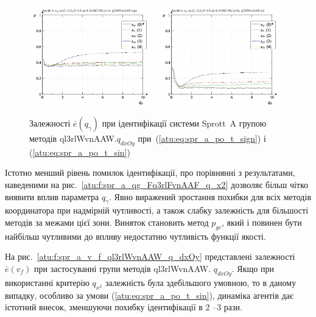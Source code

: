 \begin{figure}[htb!]
  \centerline{
    \includegraphics[width=0.49\textwidth]{p/cha/spr_a/ql3rlWvnAAW_dxOy/sprott_a_id2-p_q_gamma_sign.png}
    \hfill
    \includegraphics[width=0.49\textwidth]{p/cha/spr_a/ql3rlWvnAAW_dxOy/sprott_a_id2-p_q_gamma_sin.png}
  }
\caption{Залежності $ \overline{e} (q_\gamma) $ при ідентифікації системи Sprott~A групою методів ql3rlWvnAAW.$q_{dxOy} $ при~(\ref{atu:eq:spr_a_po_t_sign}) і (\ref{atu:eq:spr_a_po_t_sin})}
  \label{atu:f:spr_a_ql3rlWvnAAW_q_dxOy}
\end{figure}

Істотно менший рівень помилок ідентифікації, про порівнянні з
результатами, наведеними на рис.~\ref{atu:f:spr_a_qg_Fq3rlFvnAAF_q_x2} дозволяє
більш чітко виявити вплив параметра
$ q_\gamma $. Явно виражений зростання похибки для всіх методів
координатора при надмірній чутливості, а також слабку
залежність для більшості методів за межами цієї зони. Виняток
становить метод
$ p_{gc} $, який і повинен бути найбільш чутливими до впливу
недостатню чутливість функції якості.

На рис.~\ref{atu:f:spr_a_v_f_ql3rlWvnAAW_q_dxOy} представлені залежності
$ \overline{e} (v_f) $ при застосуванні групи методів ql3rlWvnAAW.
$ q_{dxOy} $. Якщо при використанні критерію
$ q_{x^2} $ залежність була здебільшого умовною, то в даному випадку,
особливо за умови (\ref{atu:eq:spr_a_po_t_sin}), динаміка агентів дає істотний
внесок, зменшуючи похибку ідентифікації в 2 --3 рази.

